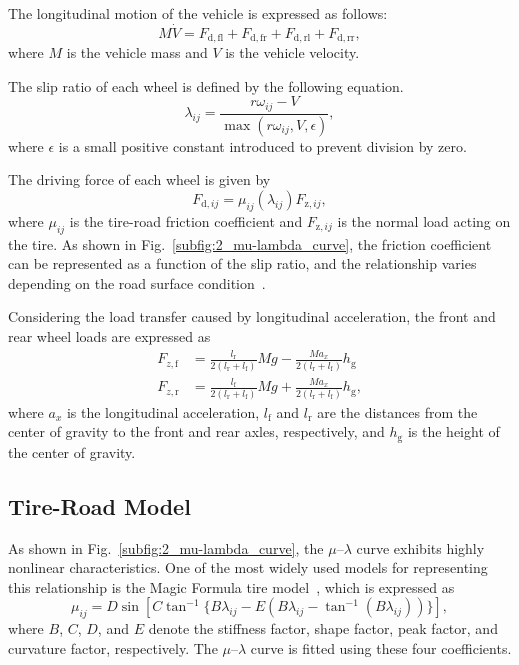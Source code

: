 \documentclass[dvipdfmx,conference]{IEEEtran}
\begin{document}
The longitudinal motion of the vehicle is expressed as follows:
\begin{equation}
\label{eq:2_vehicle_eq}
M\dot{V}
=
F_{\mathrm{d,fl}}
+
F_{\mathrm{d,fr}}
+
F_{\mathrm{d,rl}}
+
F_{\mathrm{d,rr}},
\end{equation}
where $M$ is the vehicle mass and $V$ is the vehicle velocity.

The slip ratio of each wheel is defined by the following equation.
\begin{equation}
\label{eq:2_lambda}
\lambda_{ij}
=
\frac{r\omega_{ij}-V}
{\max(r\omega_{ij},V,\epsilon)},
\end{equation}
where $\epsilon$ is a small positive constant introduced to prevent division by zero.

The driving force of each wheel is given by
\begin{equation}
\label{eq:2_F_d}
F_{\mathrm{d},ij}
=
\mu_{ij}(\lambda_{ij})
F_{\mathrm{z},ij},
\end{equation}
where $\mu_{ij}$ is the tire-road friction coefficient and $F_{\mathrm{z},ij}$ is the normal load acting on the tire. As shown in Fig.~\ref{subfig:2_mu-lambda_curve}, the friction coefficient can be represented as a function of the slip ratio, and the relationship varies depending on the road surface condition~\cite{pacejka}.

Considering the load transfer caused by longitudinal acceleration, the front and rear wheel loads are expressed as
\begin{equation}
\label{eq:2_F_z}
\begin{aligned}
F_{z,\mathrm{f}}
&=
\frac{l_\mathrm{r}}{2(l_\mathrm{r}+l_\mathrm{f})}Mg
-
\frac{Ma_x}{2(l_\mathrm{r}+l_\mathrm{f})}h_\mathrm{g}
\\
F_{z,\mathrm{r}}
&=
\frac{l_\mathrm{f}}{2(l_\mathrm{r}+l_\mathrm{f})}Mg
+
\frac{Ma_x}{2(l_\mathrm{r}+l_\mathrm{f})}h_\mathrm{g},
\end{aligned}
\end{equation}
where $a_x$ is the longitudinal acceleration, $l_\mathrm{f}$ and $l_\mathrm{r}$ are the distances from the center of gravity to the front and rear axles, respectively, and $h_\mathrm{g}$ is the height of the center of gravity.

\subsection{Tire-Road Model}
As shown in Fig.~\ref{subfig:2_mu-lambda_curve}, the $\mu$--$\lambda$ curve exhibits highly nonlinear characteristics. One of the most widely used models for representing this relationship is the Magic Formula tire model~\cite{pacejka}, which is expressed as
\begin{equation}
\label{eq:magic_formula}
\mu_{ij}
=
D\sin[C\tan^{-1}\{B\lambda_{ij}-E(B\lambda_{ij}-\tan^{-1}(B\lambda_{ij}))\}],
\end{equation}
where $B$, $C$, $D$, and $E$ denote the stiffness factor, shape factor, peak factor, and curvature factor, respectively. The $\mu$--$\lambda$ curve is fitted using these four coefficients.
\end{document}
